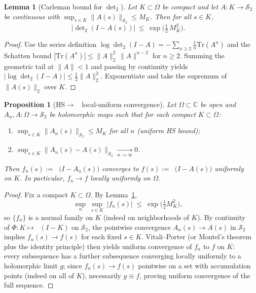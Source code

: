 \documentclass[11pt]{article}
\newtheorem{proposition}[theorem]{Proposition}
\newtheorem{lemma}[theorem]{Lemma}
\theoremstyle{definition}
\theoremstyle{remark}
\newcommand{\C}{\mathbb{C}}
\newcommand{\HS}{\mathcal{S}_2}
\DeclareMathOperator{\dettwo}{det_2}
\begin{document}
\begin{lemma}[Carleman bound for \(\det_2\)]\label{lem:carleman}
Let \(K\subset\Omega\) be compact and let \(A:K\to \HS\) be continuous with \(\sup_{s\in K}\|A(s)\|_{\HS}\le M_K\). Then for all \(s\in K\),
\[
  \big|\det\nolimits_2(I-A(s))\big|\ \le\ \exp\!\Big(\tfrac12\,M_K^2\Big).
\]
\end{lemma}
\begin{proof}
Use the series definition \(\log\det_2(I-A)=-\sum_{n\ge2}\tfrac1n\mathrm{Tr}(A^n)\) and the Schatten bound \(|\mathrm{Tr}(A^n)|\le \|A\|_2^2\,\|A\|^{n-2}\) for \(n\ge2\). Summing the geometric tail at \(\|A\|<1\) and passing by continuity yields \(|\log\det_2(I-A)|\le \tfrac12\|A\|_2^2\). Exponentiate and take the supremum of \(\|A(s)\|_2\) over \(K\).
\end{proof}

\begin{proposition}[HS\(\to\)\(\dettwo\) local-uniform convergence]\label{prop:HS-to-det2}
Let \(\Omega\subset\C\) be open and \(A_n,A:\Omega\to\HS\) be holomorphic maps such that for each compact \(K\subset\Omega\):
\begin{enumerate}
 \item \(\sup_{s\in K}\|A_n(s)\|_{\HS}\le M_K\) for all \(n\) (uniform HS bound);
 \item \(\sup_{s\in K}\|A_n(s)-A(s)\|_{\HS}\xrightarrow[n\to\infty]{}0\).
\end{enumerate}
Then \(f_n(s):=\dettwo\big(I-A_n(s)\big)\) converges to \(f(s):=\dettwo\big(I-A(s)\big)\) uniformly on \(K\). In particular, \(f_n\to f\) locally uniformly on \(\Omega\).
\end{proposition}
\begin{proof}
Fix a compact \(K\subset\Omega\). By Lemma~\ref{lem:carleman},
\[
 \sup_{n}\ \sup_{s\in K}\ |f_n(s)|\;\le\; \exp\!\Big(\tfrac12 M_K^2\Big),
\]
so \(\{f_n\}\) is a normal family on \(K\) (indeed on neighborhoods of \(K\)). By continuity of \(\Phi:K\mapsto\dettwo(I-K)\) on \(\HS\), the pointwise convergence \(A_n(s)\to A(s)\) in \(\HS\) implies \(f_n(s)\to f(s)\) for each fixed \(s\in K\). Vitali--Porter (or Montel's theorem plus the identity principle) then yields uniform convergence of \(f_n\) to \(f\) on \(K\): every subsequence has a further subsequence converging locally uniformly to a holomorphic limit \(g\); since \(f_n(s)\to f(s)\) pointwise on a set with accumulation points (indeed on all of \(K\)), necessarily \(g\equiv f\), proving uniform convergence of the full sequence.
\end{proof}
\end{document}
